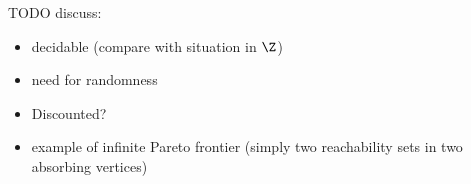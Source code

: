 TODO discuss:
\begin{itemize}
\item decidable (compare with situation in $\Z$)
\item need for randomness
\item Discounted?
\item example of infinite Pareto frontier (simply two reachability sets in two absorbing vertices)
\end{itemize}
